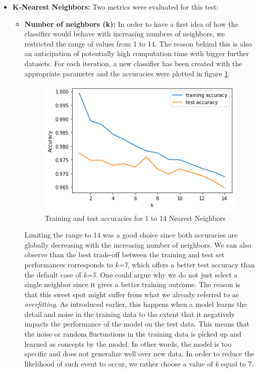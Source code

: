 \begin{itemize}
    \item \textbf{K-Nearest Neighbors:} Two metrics were evaluated for this test:
    \begin{itemize}
         \item \textbf{Number of neighbors (k):} In order to have a first idea of how the classifier would behave with increasing numbers of neighbors, we restricted the range of values from 1 to 14. The reason behind this is also an anticipation of potentially high computation time with bigger further datasets. For each iteration, a new classifier has been created with the appropriate parameter and the accuracies were plotted in figure \ref{fig:neigh}.
        \begin{figure}[!ht]
        \centering
          \includegraphics[width=0.80\linewidth]{Figures/neigh.png}
          \caption{Training and test accuracies for 1 to 14 Nearest Neighbors}
          \label{fig:neigh}
        \end{figure}
        Limiting the range to 14 was a good choice since both accuracies are globally decreasing with the increasing number of neighbors. We can also observe than the best trade-off between the training and test set performances corresponds to \textit{k=7}, which offers a better test accuracy than the default case of \textit{k=5}. One could argue why we do not just select a single neighbor since it gives a better training outcome. The reason is that this sweet spot might suffer from what we already referred to as  \textit{overfitting}. As introduced earlier, this happens when a model learns the detail and noise in the training data to the extent that it negatively impacts the performance of the model on the test data. This means that the noise or random fluctuations in the training data is picked up and learned as concepts by the model. In other words, the model is too specific and does not generalize well over new data. In order to reduce the likelihood of such event to occur, we rather choose a value of \textit{k} equal to 7.

\end{itemize}
\end{itemize}
